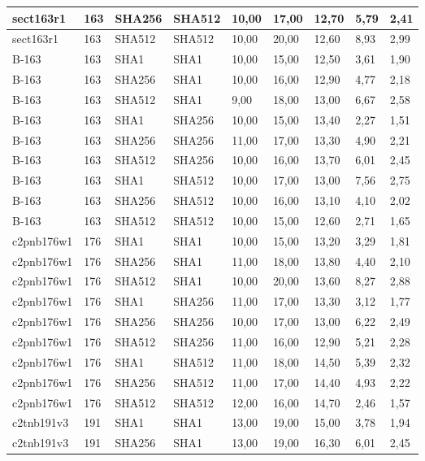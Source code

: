 \begin{longtable}{| l | l | l | l | l |l |l |l |l |}
sect163r1 & 163 & SHA256 & SHA512 & 10,00 & 17,00 & 12,70 & 5,79 & 2,41 \\ \hline 
sect163r1 & 163 & SHA512 & SHA512 & 10,00 & 20,00 & 12,60 & 8,93 & 2,99 \\ \hline 
B-163 & 163 & SHA1 & SHA1 & 10,00 & 15,00 & 12,50 & 3,61 & 1,90 \\ \hline 
B-163 & 163 & SHA256 & SHA1 & 10,00 & 16,00 & 12,90 & 4,77 & 2,18 \\ \hline 
B-163 & 163 & SHA512 & SHA1 & 9,00 & 18,00 & 13,00 & 6,67 & 2,58 \\ \hline 
B-163 & 163 & SHA1 & SHA256 & 10,00 & 15,00 & 13,40 & 2,27 & 1,51 \\ \hline 
B-163 & 163 & SHA256 & SHA256 & 11,00 & 17,00 & 13,30 & 4,90 & 2,21 \\ \hline 
B-163 & 163 & SHA512 & SHA256 & 10,00 & 16,00 & 13,70 & 6,01 & 2,45 \\ \hline 
B-163 & 163 & SHA1 & SHA512 & 10,00 & 17,00 & 13,00 & 7,56 & 2,75 \\ \hline 
B-163 & 163 & SHA256 & SHA512 & 10,00 & 16,00 & 13,10 & 4,10 & 2,02 \\ \hline 
B-163 & 163 & SHA512 & SHA512 & 10,00 & 15,00 & 12,60 & 2,71 & 1,65 \\ \hline 
c2pnb176w1 & 176 & SHA1 & SHA1 & 10,00 & 15,00 & 13,20 & 3,29 & 1,81 \\ \hline 
c2pnb176w1 & 176 & SHA256 & SHA1 & 11,00 & 18,00 & 13,80 & 4,40 & 2,10 \\ \hline 
c2pnb176w1 & 176 & SHA512 & SHA1 & 10,00 & 20,00 & 13,60 & 8,27 & 2,88 \\ \hline 
c2pnb176w1 & 176 & SHA1 & SHA256 & 11,00 & 17,00 & 13,30 & 3,12 & 1,77 \\ \hline 
c2pnb176w1 & 176 & SHA256 & SHA256 & 10,00 & 17,00 & 13,00 & 6,22 & 2,49 \\ \hline 
c2pnb176w1 & 176 & SHA512 & SHA256 & 11,00 & 16,00 & 12,90 & 5,21 & 2,28 \\ \hline 
c2pnb176w1 & 176 & SHA1 & SHA512 & 11,00 & 18,00 & 14,50 & 5,39 & 2,32 \\ \hline 
c2pnb176w1 & 176 & SHA256 & SHA512 & 11,00 & 17,00 & 14,40 & 4,93 & 2,22 \\ \hline 
c2pnb176w1 & 176 & SHA512 & SHA512 & 12,00 & 16,00 & 14,70 & 2,46 & 1,57 \\ \hline 
c2tnb191v3 & 191 & SHA1 & SHA1 & 13,00 & 19,00 & 15,00 & 3,78 & 1,94 \\ \hline 
c2tnb191v3 & 191 & SHA256 & SHA1 & 13,00 & 19,00 & 16,30 & 6,01 & 2,45 \\ \hline 

\end{longtable}
